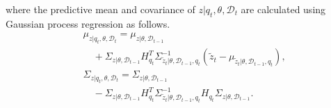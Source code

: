 \documentclass[letterpaper, 10 pt, conference]{ieeeconf}
\newcommand{\mc}[1]{\mathcal{#1}} \newcommand{\mb}[1]{\mathbf{#1}}
\newcommand{\D}[2]{\mc{D}_{#2}}
\newcommand{\q}[1]{{q_{#1}}}
\begin{document}
where the predictive mean and covariance of $z|\q{t},\theta, \D{}{t}$ are calculated using Gaussian process regression as follows.
\begin{equation}
\begin{split}
		& \mu_{z|\q{t},\theta, \D{}{t}} =
		\mu_{z| \theta,\D{1}{t-1}} \\
		& \quad + \Sigma_{z| \theta,\D{1}{t-1}} H_{q_t}^T
		\Sigma_{\tilde{z}_{t}|\theta,\D{1}{t-1},\q{t}}^{-1} 
		(\tilde{z}_{t}-\mu_{\tilde{z}_t|\theta,\D{1}{t-1},\q{t}}),\\
		&\Sigma_{z|\q{t},\theta, \D{}{t}} = 	\Sigma_{z| \theta,\D{1}{t-1}} \\
		&\quad - 
		\Sigma_{z| \theta,\D{1}{t-1}} H_{q_t}^T 
		\Sigma_{\tilde{z}_{t}|\theta,\D{1}{t-1},\q{t}}^{-1} H_{q_t} 
		\Sigma_{z| \theta,\D{1}{t-1}}.
\end{split}
\label{eq:}
\end{equation}
 
\end{document}
